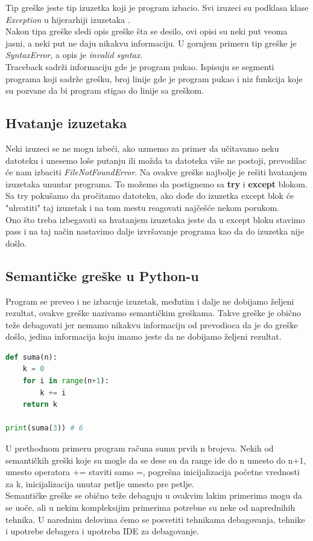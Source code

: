 \documentclass[a4paper]{article}
\begin{document}
Tip greške jeste tip izuzetka koji je program izbacio. Svi izuzeci su podklasa klase \emph{Exception} u hijerarhiji izuzetaka \cite{excDocPyt}.\\
Nakon tipa greške sledi opis greške šta se desilo, ovi opisi su neki put veoma jasni, a neki put ne daju nikakvu informaciju. U gornjem primeru tip greške je \emph{SyntaxError}, a opis je \emph{invalid syntax}.\\
Traceback sadrži informaciju gde je program pukao. Ispisuju se segmenti programa koji sadrže grešku, broj linije gde je program pukao i niz funkcija koje su pozvane da bi program stigao do linije sa greškom.
\subsection{Hvatanje izuzetaka}
Neki izuzeci se ne mogu izbeći, ako uzmemo za primer da učitavamo neku datoteku i unesemo loše putanju ili možda ta datoteka više ne postoji, prevodilac će nam izbaciti \emph{FileNotFoundError}. Na ovakve greške najbolje je rešiti hvatanjem izuzetaka ununtar programa. To možemo da postignemo sa \textbf{try} i \textbf{except} blokom. Sa try pokušamo da pročitamo datoteku, ako dođe do izuzetka except blok će "uhvatiti" taj izuzetak i na tom mestu reagovati najčešće nekom porukom.\\
Ono što treba izbegavati sa hvatanjem izuzetaka jeste da u except bloku stavimo pass i na taj način nastavimo dalje izvršavanje programa kao da do izuzetka nije došlo\cite{proPyDeb}.
\subsection{Semantičke greške u Python-u}	
Program se preveo i ne izbacuje izuzetak, međutim i dalje ne dobijamo željeni rezultat, ovakve greške nazivamo semantičkim greškama. Takve greške je obično teže debagovati jer nemamo nikakvu informaciju od prevodioca da je do greške došlo, jedina informacija koju imamo jeste da ne dobijamo željeni rezultat. 
\begin{lstlisting}[language = python, caption = {Funkcija koja računa sumu prvih n brojeva}]
def suma(n):
    k = 0
    for i in range(n+1):
        k += i
    return k

print(suma(3)) # 6
\end{lstlisting}
U prethodnom primeru program računa sumu prvih n brojeva. Nekih od semantičkih greški koje su mogle da se dese su da range ide do n umesto do n+1, umesto operatora += staviti samo =, pogrešna inicijalizacija početne vrednosti za k, inicijalizacija unutar petlje umesto pre petlje.\\
Semantičke greške se obično teže debaguju u ovakvim lakim primerima mogu da se uoče, ali u nekim kompleksijim primerima potrebne su neke od naprednihih tehnika. U narednim delovima ćemo se posvetiti tehnikama debagovanja, tehnike i upotrebe debagera i upotreba IDE za debagovanje.
\end{document}
